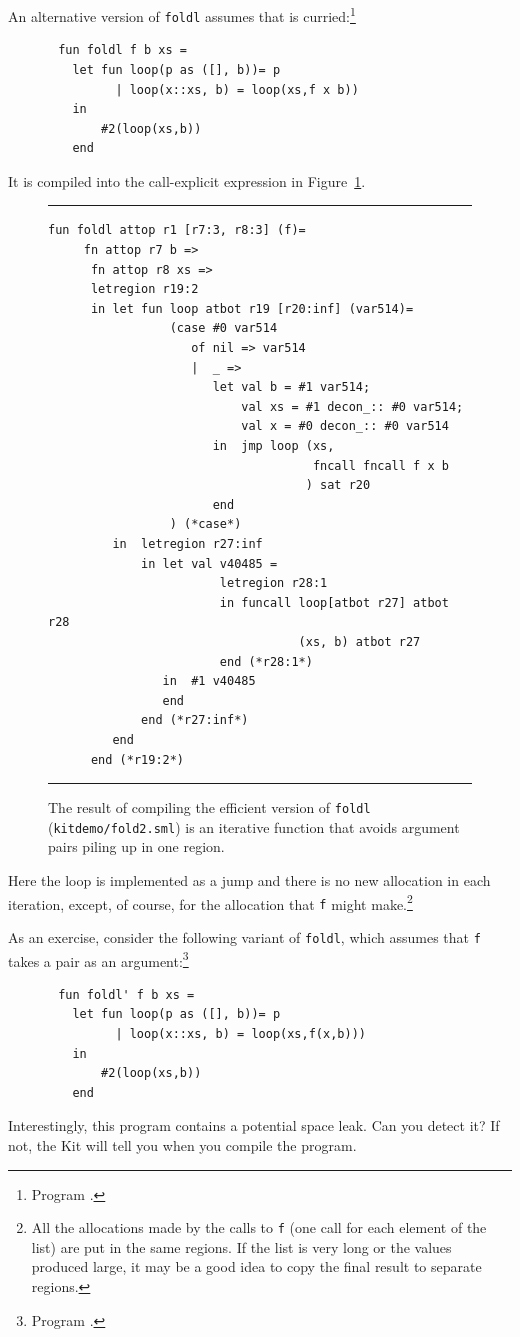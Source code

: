 \documentclass[12pt]{book}
\begin{document}
An alternative version of {\tt foldl} assumes that 
is curried:\footnote{Program .}
\begin{verbatim}
       fun foldl f b xs = 
         let fun loop(p as ([], b))= p
               | loop(x::xs, b) = loop(xs,f x b))
         in
             #2(loop(xs,b))
         end
\end{verbatim}
It is compiled into the  call-explicit expression in Figure~\ref{fold2.fig}.
\begin{figure}
\hrule \medskip
\begin{verbatim}
fun foldl attop r1 [r7:3, r8:3] (f)= 
     fn attop r7 b => 
      fn attop r8 xs => 
      letregion r19:2 
      in let fun loop atbot r19 [r20:inf] (var514)= 
                 (case #0 var514 
                    of nil => var514
                    |  _ => 
                       let val b = #1 var514; 
                           val xs = #1 decon_:: #0 var514; 
                           val x = #0 decon_:: #0 var514
                       in  jmp loop (xs, 
                                     fncall fncall f x b
                                    ) sat r20
                       end 
                 ) (*case*) 
         in  letregion r27:inf 
             in let val v40485 = 
                        letregion r28:1 
                        in funcall loop[atbot r27] atbot r28 
                                   (xs, b) atbot r27 
                        end (*r28:1*)
                in  #1 v40485
                end  
             end (*r27:inf*)
         end  
      end (*r19:2*)
\end{verbatim}
\caption{The result of compiling the efficient version of {\tt foldl} ({\tt kitdemo/fold2.sml}) is an 
  iterative function that avoids argument pairs piling up in one
  region.}  \medskip \hrule
\label{fold2.fig}
\end{figure}
Here the loop is implemented as a
jump and there is no new allocation in each
iteration, except, of course, for the allocation that {\tt f} might
make.\footnote{All the allocations made by the calls to {\tt f} (one
  call for each element of the list) are put in the same regions. If
  the list is very long or the values produced large, it may be a good
  idea to copy the final result to separate regions.}

As an exercise, consider the following variant of {\tt foldl}, which assumes that
{\tt f} takes a pair as an argument:\footnote{Program .}
\begin{verbatim}
       fun foldl' f b xs = 
         let fun loop(p as ([], b))= p
               | loop(x::xs, b) = loop(xs,f(x,b)))
         in
             #2(loop(xs,b))
         end
\end{verbatim}
Interestingly, this program contains a potential space leak. Can you
detect it? If not, the Kit will tell you when you compile the program.
\end{document}
